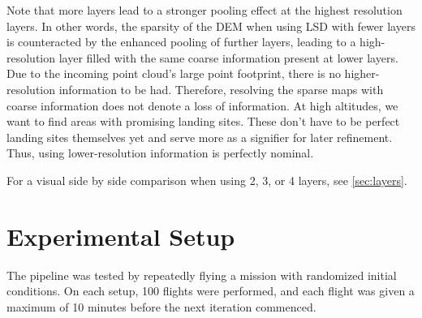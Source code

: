 Note that more layers lead to a stronger pooling effect at the highest resolution layers. In other words, the sparsity of the DEM when using LSD with fewer layers is counteracted by the enhanced pooling of further layers, leading to a high-resolution layer filled with the same coarse information present at lower layers. Due to the incoming point cloud's large point footprint, there is no higher-resolution information to be had. Therefore, resolving the sparse maps with coarse information does not denote a loss of information. At high altitudes, we want to find areas with promising landing sites. These don't have to be perfect landing sites themselves yet and serve more as a signifier for later refinement. Thus, using lower-resolution information is perfectly nominal.

For a visual side by side comparison when using 2, 3, or 4 layers, see \cref{sec:layers}.

\section{Experimental Setup}\label{sec:exp_setup}

The pipeline was tested by repeatedly flying a mission with randomized initial conditions. On each setup, 100 flights were performed, and each flight was given a maximum of 10 minutes before the next iteration commenced.
